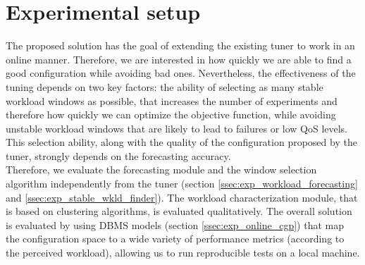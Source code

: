 \documentclass[a4paper, 12pt]{article} %
\begin{document}
	\section{Experimental setup } \label{sec:exp_setup}
	The proposed solution has the goal of extending the existing tuner \cite{AkamasCGP} to work in an online manner. Therefore, we are interested in how quickly we are able to find a good configuration while avoiding bad ones. Nevertheless, the effectiveness of the tuning depends on two key factors: the ability of selecting as many stable workload windows as possible, that increases the number of experiments and therefore how quickly we can optimize the objective function, while avoiding unstable workload windows that are likely to lead to failures or low QoS levels. This selection ability,  along with the quality of the configuration proposed by the tuner, strongly depends on the forecasting accuracy.\\
	Therefore, we evaluate the forecasting module and the window selection algorithm independently from the tuner (section \ref{ssec:exp_workload_forecasting} and \ref{ssec:exp_stable_wkld_finder}). The workload characterization module, that is based on clustering algorithms, is evaluated qualitatively. The overall solution is evaluated by using DBMS models (section \ref{ssec:exp_online_cgp}) that map the configuration space to a wide variety of performance metrics (according to the perceived workload), allowing us to run reproducible tests on a local machine.
	
\end{document}
